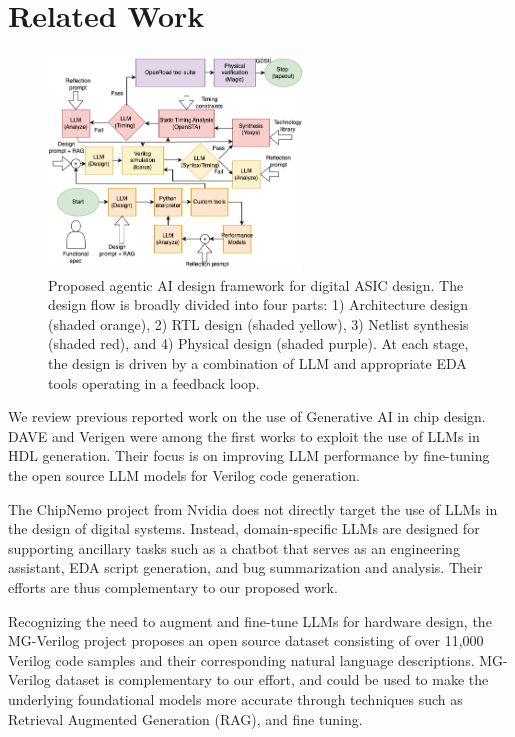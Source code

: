 \section{Related Work}
\label{sec:related_work}

\begin{figure}[htbp]
    \centering
    \includegraphics[width=0.6\textwidth]{figs/system_design_v2.png} 
    \caption{Proposed agentic AI design framework for digital ASIC design. The design flow is broadly divided into four parts: 1) Architecture design (shaded orange), 2) RTL design (shaded yellow), 3) Netlist synthesis (shaded red), and 4) Physical design (shaded purple). At each stage, the design is driven by a combination of LLM and appropriate EDA tools operating in a feedback loop.  }
    \label{fig:agentic_designflow}
\end{figure}
We review previous reported work on the use of Generative AI in chip design. DAVE \cite{dave} and Verigen \cite{verigen} were among the first works to exploit the use of LLMs in HDL generation. Their focus is on improving LLM performance by fine-tuning the open source LLM models for Verilog code generation. 

The ChipNemo project \cite{chipnemo} from Nvidia does not directly target the use of LLMs in the design of digital systems. Instead, domain-specific LLMs are designed for supporting ancillary tasks such as a chatbot that serves as an engineering assistant, EDA script generation, and bug summarization and analysis. Their efforts are thus complementary to our proposed work. 

Recognizing the need to augment and fine-tune LLMs for hardware design, the MG-Verilog \cite{mg-verilog} project proposes an open source dataset consisting of over 11,000 Verilog code samples and their corresponding natural language descriptions. MG-Verilog dataset is complementary to our effort, and could be used to make the underlying foundational models more accurate through techniques such as Retrieval Augmented Generation (RAG), and fine tuning.  

